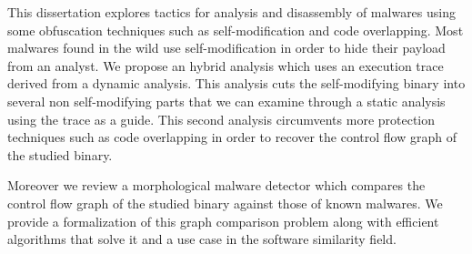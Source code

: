 This dissertation explores tactics for analysis and disassembly of malwares using some obfuscation techniques such as self-modification and code overlapping.
Most malwares found in the wild use self-modification in order to hide their payload from an analyst.
We propose an hybrid analysis which uses an execution trace derived from a dynamic analysis.
This analysis cuts the self-modifying binary into several non self-modifying parts that we can examine through a static analysis using the trace as a guide.
This second analysis circumvents more protection techniques such as code overlapping in order to recover the control flow graph of the studied binary.

Moreover we review a morphological malware detector which compares the control flow graph of the studied binary against those of known malwares.
We provide a formalization of this graph comparison problem along with efficient algorithms that solve it and a use case in the software similarity field.